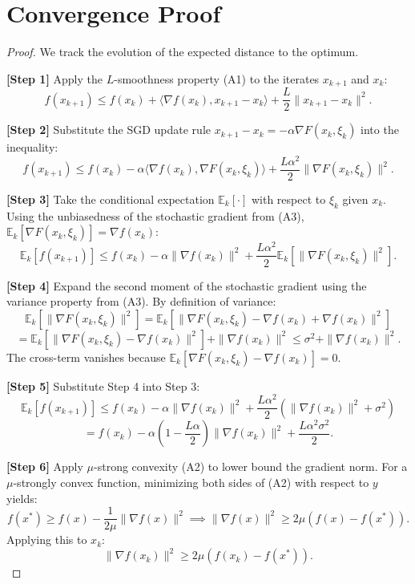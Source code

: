 \documentclass[11pt]{article}
\begin{document}
\section{Convergence Proof}

\begin{proof}
We track the evolution of the expected distance to the optimum. 

\textbf{[Step 1]} Apply the $L$-smoothness property (A1) to the iterates $x_{k+1}$ and $x_k$:
\[ f(x_{k+1}) \le f(x_k) + \langle \nabla f(x_k), x_{k+1} - x_k \rangle + \frac{L}{2} \|x_{k+1} - x_k\|^2. \]

\textbf{[Step 2]} Substitute the SGD update rule $x_{k+1} - x_k = -\alpha \nabla F(x_k, \xi_k)$ into the inequality:
\[ f(x_{k+1}) \le f(x_k) - \alpha \langle \nabla f(x_k), \nabla F(x_k, \xi_k) \rangle + \frac{L \alpha^2}{2} \|\nabla F(x_k, \xi_k)\|^2. \]

\textbf{[Step 3]} Take the conditional expectation $\mathbb{E}_k[\cdot]$ with respect to $\xi_k$ given $x_k$. Using the unbiasedness of the stochastic gradient from (A3), $\mathbb{E}_k[\nabla F(x_k, \xi_k)] = \nabla f(x_k)$:
\[ \mathbb{E}_k[f(x_{k+1})] \le f(x_k) - \alpha \|\nabla f(x_k)\|^2 + \frac{L \alpha^2}{2} \mathbb{E}_k[\|\nabla F(x_k, \xi_k)\|^2]. \]

\textbf{[Step 4]} Expand the second moment of the stochastic gradient using the variance property from (A3). By definition of variance:
\[ \mathbb{E}_k[\|\nabla F(x_k, \xi_k)\|^2] = \mathbb{E}_k[\|\nabla F(x_k, \xi_k) - \nabla f(x_k) + \nabla f(x_k)\|^2] \]
\[ = \mathbb{E}_k[\|\nabla F(x_k, \xi_k) - \nabla f(x_k)\|^2] + \|\nabla f(x_k)\|^2 \le \sigma^2 + \|\nabla f(x_k)\|^2. \]
The cross-term vanishes because $\mathbb{E}_k[\nabla F(x_k, \xi_k) - \nabla f(x_k)] = 0$.

\textbf{[Step 5]} Substitute Step 4 into Step 3:
\[ \mathbb{E}_k[f(x_{k+1})] \le f(x_k) - \alpha \|\nabla f(x_k)\|^2 + \frac{L \alpha^2}{2} (\|\nabla f(x_k)\|^2 + \sigma^2) \]
\[ = f(x_k) - \alpha \left( 1 - \frac{L \alpha}{2} \right) \|\nabla f(x_k)\|^2 + \frac{L \alpha^2 \sigma^2}{2}. \]

\textbf{[Step 6]} Apply $\mu$-strong convexity (A2) to lower bound the gradient norm. For a $\mu$-strongly convex function, minimizing both sides of (A2) with respect to $y$ yields:
\[ f(x^*) \ge f(x) - \frac{1}{2\mu} \|\nabla f(x)\|^2 \implies \|\nabla f(x)\|^2 \ge 2\mu (f(x) - f(x^*)). \]
Applying this to $x_k$:
\[ \|\nabla f(x_k)\|^2 \ge 2\mu (f(x_k) - f(x^*)). \]


\end{proof}
\end{document}
